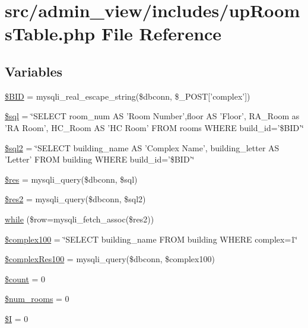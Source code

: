 \hypertarget{upRoomsTable_8php}{\section{src/admin\-\_\-view/includes/up\-Rooms\-Table.php \-File \-Reference}
\label{upRoomsTable_8php}
}
\subsection*{\-Variables}
\begin{DoxyCompactItemize}
\item 
\hyperlink{upRoomsTable_8php_a7458cf5c1cfaeb93fe055362ecff999e}{\$\-B\-I\-D} = mysqli\-\_\-real\-\_\-escape\-\_\-string(\$dbconn, \$\-\_\-\-P\-O\-S\-T\mbox{[}'complex'\mbox{]})
\item 
\hyperlink{upRoomsTable_8php_a047170d6020a882807665812a27e2525}{\$sql} = \char`\"{}\-S\-E\-L\-E\-C\-T room\-\_\-num \-A\-S '\-Room \-Number',floor \-A\-S '\-Floor', \-R\-A\-\_\-\-Room as '\-R\-A \-Room', \-H\-C\-\_\-\-Room \-A\-S '\-H\-C \-Room' \-F\-R\-O\-M rooms \-W\-H\-E\-R\-E build\-\_\-id='\$\-B\-I\-D'\char`\"{}
\item 
\hyperlink{upRoomsTable_8php_a1ad0ffe3fa0755e56a1a6bb40c232b8a}{\$sql2} = \char`\"{}\-S\-E\-L\-E\-C\-T building\-\_\-name \-A\-S '\-Complex \-Name', building\-\_\-letter \-A\-S '\-Letter' \-F\-R\-O\-M building \-W\-H\-E\-R\-E build\-\_\-id='\$\-B\-I\-D'\char`\"{}
\item 
\hyperlink{upRoomsTable_8php_a49a8a4009b02e49717caa88b128affc5}{\$res} = mysqli\-\_\-query(\$dbconn, \$sql)
\item 
\hyperlink{upRoomsTable_8php_a3977504adc01ced790e56cece5e24b60}{\$res2} = mysqli\-\_\-query(\$dbconn, \$sql2)
\item 
\hyperlink{upRoomsTable_8php_ac3862ddd2ba0a132de05b14eab1a8e7d}{while} (\$row=mysqli\-\_\-fetch\-\_\-assoc(\$res2))
\item 
\hyperlink{upRoomsTable_8php_a649817e46b95fbef9ea44e119999dada}{\$complex100} = \char`\"{}\-S\-E\-L\-E\-C\-T building\-\_\-name \-F\-R\-O\-M building \-W\-H\-E\-R\-E complex=1\char`\"{}
\item 
\hyperlink{upRoomsTable_8php_aa5d9e7c76b4a1d987e4877d6115c0a38}{\$complex\-Res100} = mysqli\-\_\-query(\$dbconn, \$complex100)
\item 
\hyperlink{upRoomsTable_8php_af789423037bbc89dc7c850e761177570}{\$count} = 0
\item 
\hyperlink{upRoomsTable_8php_ad51cf907141b35051a8d4123b3e7e259}{\$num\-\_\-rooms} = 0
\item 
\hyperlink{upRoomsTable_8php_a46163db64b57db961d4bb2ada2d923f9}{\$\-I} = 0
\end{DoxyCompactItemize}


